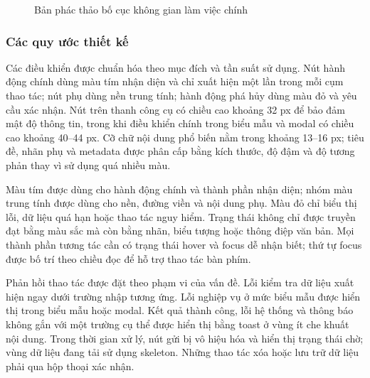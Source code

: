 \documentclass[../DoAn.tex]{subfiles}
\begin{document}
\begin{figure}[H]
    \caption{Bản phác thảo bố cục không gian làm việc chính}
    \label{fig:chapter4_ui_workspace_wireframe}
\end{figure}

\subsubsection{Các quy ước thiết kế}

Các điều khiển được chuẩn hóa theo mục đích và tần suất sử dụng. Nút hành động chính dùng màu tím nhận diện và chỉ xuất hiện một lần trong mỗi cụm thao tác; nút phụ dùng nền trung tính; hành động phá hủy dùng màu đỏ và yêu cầu xác nhận. Nút trên thanh công cụ có chiều cao khoảng 32 px để bảo đảm mật độ thông tin, trong khi điều khiển chính trong biểu mẫu và modal có chiều cao khoảng 40--44 px. Cỡ chữ nội dung phổ biến nằm trong khoảng 13--16 px; tiêu đề, nhãn phụ và metadata được phân cấp bằng kích thước, độ đậm và độ tương phản thay vì sử dụng quá nhiều màu.

Màu tím được dùng cho hành động chính và thành phần nhận diện; nhóm màu trung tính được dùng cho nền, đường viền và nội dung phụ. Màu đỏ chỉ biểu thị lỗi, dữ liệu quá hạn hoặc thao tác nguy hiểm. Trạng thái không chỉ được truyền đạt bằng màu sắc mà còn bằng nhãn, biểu tượng hoặc thông điệp văn bản. Mọi thành phần tương tác cần có trạng thái hover và focus dễ nhận biết; thứ tự focus được bố trí theo chiều đọc để hỗ trợ thao tác bàn phím.

Phản hồi thao tác được đặt theo phạm vi của vấn đề. Lỗi kiểm tra dữ liệu xuất hiện ngay dưới trường nhập tương ứng. Lỗi nghiệp vụ ở mức biểu mẫu được hiển thị trong biểu mẫu hoặc modal. Kết quả thành công, lỗi hệ thống và thông báo không gắn với một trường cụ thể được hiển thị bằng toast ở vùng ít che khuất nội dung. Trong thời gian xử lý, nút gửi bị vô hiệu hóa và hiển thị trạng thái chờ; vùng dữ liệu đang tải sử dụng skeleton. Những thao tác xóa hoặc lưu trữ dữ liệu phải qua hộp thoại xác nhận.
\end{document}
